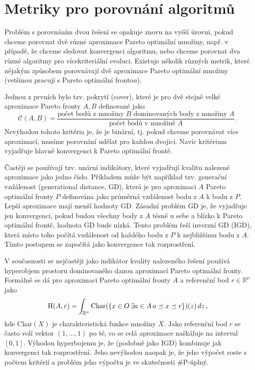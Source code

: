 \section{Metriky pro porovnání algoritmů}

Problém s porovnáním dvou řešení se opakuje znovu na vyšší úrovni, pokud chceme porovnat dvě různé aproximace Pareto optimální množiny, např. v případě, že chceme sledovat konvergenci algoritmu, nebo chceme porovnat dva různé algoritmy pro vícekriteriální evoluci. Existuje několik různých metrik, které nějakým způsobem porovnávají dvě aproximace Pareto optimální množiny (vetšinou pracují s Pareto optimální frontou). 

Jednou z prvních bylo tzv. pokrytí (cover), které je pro dvě stejně velké aproximace Pareto fronty $A, B$ definované jako 
$$\mathcal{C}(A, B) = \frac{\text{počet bodů z množiny $B$ dominovaných body z množiny $A$}}{\text{počet bodů v množině $A$}}\,.$$
Nevýhodou tohoto kritéria je, že je binární, tj. pokud chceme porovnávat více aproximací, musíme porovnání udělat pro každou dvojici. Navíc kritérium vyjadřuje hlavně konvergenci k Pareto optimální frontě.

Častěji se používají tzv. unární indikátory, které vyjadřují kvalitu nalezené aproximace jako jedno číslo. Příkladem může být například tzv. generační vzdálenost (generational distance, GD), která je pro aproximaci $A$ Pareto optimální fronty $P$ definována jako průměrná vzdálenost bodu z $A$ k bodu z $P$. Lepší aproximace mají menší hodnoty GD. Zásadní problém GD je, že vyjadřuje jen konvergenci, pokud budou všechny body z $A$ těsně u sebe a blízko k Pareto optimální frontě, hodnota GD bude nízká. Tento problém řeší inverzní GD (IGD), která místo toho počítá vzdálenost od každého bodu z $P$ k nejbližšímu bodu z $A$. Tímto postupem se započítá jako konvergence tak rozprostření.

V současnosti se nejčastěji jako indikátor kvality nalezeného řešení používá hyperobjem prostoru dominovaného danou aproximací Pareto optimální fronty. Formálně se dá pro aproximaci Pareto optimální fronty $A$ a referenční bod $r\in \mathbb{R^n}$ jako 
$$
\mathrm{H}(A,r)=\int_{{\mathbb{R}}^n}\mathrm{Char}(\{x\in O\,\exists a\in A\, a\preceq x\preceq r\})(z)\, dz\,,
$$
kde $\mathrm{Char}(X)$ je charakteristická funkce množiny $X$. Jako referenční bod $r$ se často volí vektor $(1, \dots, 1)$ po té, co se celá aproximace naškáluje na interval $[0,1]$. Výhodou hyperbojemu je, že (podobně jako IGD) kombinuje jak konvergenci tak rozprostření. Jeho nevýhodou naopak je, že jeho výpočet roste s počtem kritérií a problém jeho výpočtu je ve skutečnosti $\#\mathrm{P}$-úplný.
